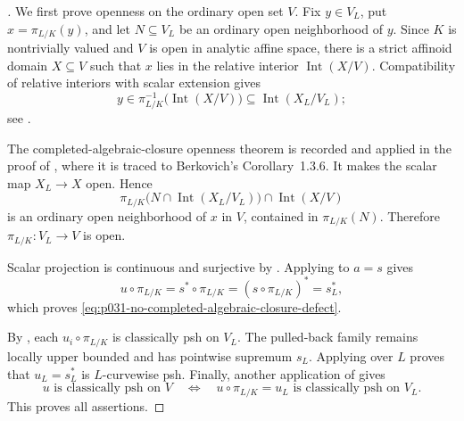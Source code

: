 
\begin{proof}[]
We first prove openness on the ordinary open set $V$.  Fix $y\in V_L$,
put $x=\pi_{L/K}(y)$, and let $N\subseteq V_L$ be an ordinary open
neighborhood of $y$.  Since $K$ is nontrivially valued and $V$ is open in
analytic affine space, there is a strict affinoid domain $X\subseteq V$
such that $x$ lies in the relative interior $\operatorname{Int}(X/V)$.
Compatibility of relative interiors with scalar extension gives
\[
 y\in\pi_{L/K}^{-1}\bigl(\operatorname{Int}(X/V)\bigr)
       \subseteq\operatorname{Int}(X_L/V_L);
\]
see \cite[\S2.11(5)]{GR25Classical}.

The completed-algebraic-closure openness theorem is recorded and applied
in the proof of \cite[Proposition~3.5(9)]{GR25Classical}, where it is
traced to Berkovich's Corollary~1.3.6.  It makes the scalar map
$X_L\to X$ open.  Hence
\[
 \pi_{L/K}\bigl(N\cap\operatorname{Int}(X_L/V_L)\bigr)
       \cap\operatorname{Int}(X/V)
\]
is an ordinary open neighborhood of $x$ in $V$, contained in
$\pi_{L/K}(N)$.  Therefore $\pi_{L/K}:V_L\to V$ is open.

Scalar projection is continuous and surjective by
\cite[\S2.9]{GR25Classical}.  Applying
 to $a=s$ gives
\[
              u\circ\pi_{L/K}
                 =s^*\circ\pi_{L/K}
                 =(s\circ\pi_{L/K})^*=s_L^*,
\]
which proves \eqref{eq:p031-no-completed-algebraic-closure-defect}.

By \cite[Proposition~4.2(5)]{GR25Classical}, each
$u_i\circ\pi_{L/K}$ is classically psh on $V_L$.  The pulled-back family
remains locally upper bounded and has pointwise supremum $s_L$.
Applying  over $L$ proves that
$u_L=s_L^*$ is $L$-curvewise psh.  Finally, another application of
\cite[Proposition~4.2(5)]{GR25Classical} gives
\[
 u\text{ is classically psh on }V
 \quad\Longleftrightarrow\quad
 u\circ\pi_{L/K}=u_L\text{ is classically psh on }V_L.
\]
This proves all assertions.
\end{proof}

